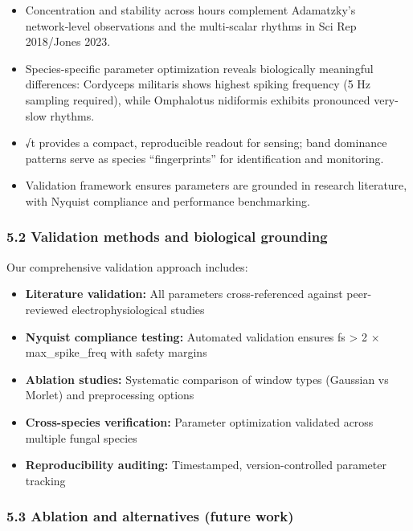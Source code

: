 \documentclass[
  11pt,
]{article}
\providecommand{\tightlist}{%
  \setlength{\itemsep}{0pt}\setlength{\parskip}{0pt}}
\begin{document}
\begin{itemize}
\tightlist
\item
  Concentration and stability across hours complement Adamatzky's
  network‑level observations and the multi‑scalar rhythms in Sci Rep
  2018/Jones 2023.
\item
  Species-specific parameter optimization reveals biologically
  meaningful differences: Cordyceps militaris shows highest spiking
  frequency (5 Hz sampling required), while Omphalotus nidiformis
  exhibits pronounced very-slow rhythms.
\item
  √t provides a compact, reproducible readout for sensing; band
  dominance patterns serve as species ``fingerprints'' for
  identification and monitoring.
\item
  Validation framework ensures parameters are grounded in research
  literature, with Nyquist compliance and performance benchmarking.
\end{itemize}

\hypertarget{validation-methods-and-biological-grounding}{%
\subsubsection{5.2 Validation methods and biological
grounding}\label{validation-methods-and-biological-grounding}}

Our comprehensive validation approach includes:

\begin{itemize}
\tightlist
\item
  \textbf{Literature validation:} All parameters cross-referenced
  against peer-reviewed electrophysiological studies
\item
  \textbf{Nyquist compliance testing:} Automated validation ensures fs
  \textgreater{} 2 × max\_spike\_freq with safety margins
\item
  \textbf{Ablation studies:} Systematic comparison of window types
  (Gaussian vs Morlet) and preprocessing options
\item
  \textbf{Cross-species verification:} Parameter optimization validated
  across multiple fungal species
\item
  \textbf{Reproducibility auditing:} Timestamped, version-controlled
  parameter tracking
\end{itemize}

\hypertarget{ablation-and-alternatives-future-work}{%
\subsubsection{5.3 Ablation and alternatives (future
work)}\label{ablation-and-alternatives-future-work}}
\end{document}
